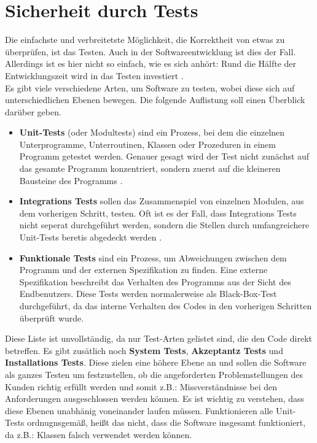 \section{Sicherheit durch Tests}
Die einfachste und verbreitetste Möglichkeit, die Korrektheit von etwas zu überprüfen, ist das Testen. Auch in der Softwareentwicklung ist dies der Fall. Allerdings ist es hier nicht so einfach, wie es sich anhört: Rund die Hälfte der Entwicklungszeit wird in das Testen investiert \citep[Introduction]{artoftesting.2011}.\\
Es gibt viele verschiedene Arten, um Software zu testen, wobei diese sich auf unterschiedlichen Ebenen bewegen. Die folgende Auflistung soll einen Überblick darüber geben. 
\begin{itemize}
  \item \textbf{Unit-Tests} (oder Modultests) sind ein Prozess, bei dem die einzelnen Unterprogramme, Unterroutinen, Klassen oder Prozeduren in einem Programm getestet werden. Genauer gesagt wird der Test nicht zunächst auf das gesamte Programm konzentriert, sondern zuerst auf die kleineren Bausteine des Programms \citep[S. 85]{artoftesting.2011}.
  \item \textbf{Integrations Tests} sollen das Zusammenspiel von einzelnen Modulen, aus dem vorherigen Schritt, testen. Oft ist es der Fall, dass Integrations Tests nicht seperat durchgeführt werden, sondern die Stellen durch umfangreichere Unit-Tests beretis abgedeckt werden \citep[S. 117 f.]{artoftesting.2011}.
  \item \textbf{Funktionale Tests} sind ein Prozess, um Abweichungen zwischen dem Programm und der externen Spezifikation zu finden. Eine externe Spezifikation beschreibt das Verhalten des Programms aus der Sicht des Endbenutzers. Diese Tests werden normalerweise als Black-Box-Test durchgeführt, da das interne Verhalten des Codes in den vorherigen Schritten überprüft wurde. \citep[S. 119]{artoftesting.2011}
\end{itemize}
Diese Liste ist unvollständig, da nur Test-Arten gelistet sind, die den Code direkt betreffen. Es gibt zusätlich noch \textbf{System Tests}, \textbf{Akzeptantz Tests} und \textbf{Installations Tests}. Diese zielen eine höhere Ebene an und sollen die Software als ganzes Testen um festzustellen, ob die angeforderten Problemstellungen des Kunden richtig erfüllt werden und somit z.B.: Missverständnisse bei den Anforderungen ausgeschlossen werden können.
Es ist wichtig zu verstehen, dass diese Ebenen unabhänig voneinander laufen müssen. Funktionieren alle Unit-Tests ordnugnsgemäß, heißt das nicht, dass die Software insgesamt funktioniert, da z.B.: Klassen falsch verwendet werden können.
